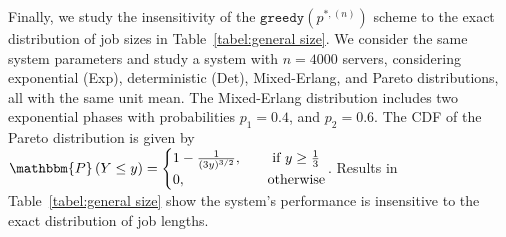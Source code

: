\documentclass[a4paper]{article}
\theoremstyle{plain}
\theoremstyle{definition}
\theoremstyle{case}
\theoremstyle{remark}
\newcommand{\brac}[1]{\left(#1\right)}
\begin{document}
%

Finally, we study the insensitivity of the $\texttt{greedy}(p^{*,(n)})$ scheme to the exact distribution of job sizes in Table~\ref{tabel:general size}. We consider the same system parameters %
and study a system with $n=4000$ servers, considering exponential (Exp), deterministic (Det), Mixed-Erlang, and Pareto distributions, all with the same unit mean. The Mixed-Erlang distribution includes two exponential phases with probabilities $p_1=0.4$, and $p_2=0.6$. The CDF of the Pareto distribution is given by
$\mathbbm{P} \brac{Y \leq y} = \begin{cases}
     1- \frac{1}{(3y)^{3/2}},\quad &\text{ if } y \geq \frac{1}{3}\\
     0, \quad &\text{otherwise}
\end{cases}$. Results in Table~\ref{tabel:general size} show the system's performance is insensitive to the exact distribution of job lengths.%
\end{document}
